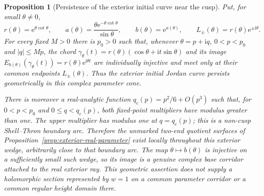\documentclass[11pt,a4paper]{article}
\newtheorem{proposition}[theorem]{Proposition}
\theoremstyle{definition}
\newcommand{\eee}{\mathrm{e}}
\newcommand{\ii}{\mathrm{i}}
\begin{document}
\begin{proposition}[Persistence of the exterior initial curve near the cusp]
\label{prop:exterior-curve-collar}
Put, for small $\theta\ne0$,
\[
 r(\theta)=\eee^{\theta\cot\theta},\qquad
 a(\theta)=\frac{\theta\eee^{-\theta\cot\theta}}{\sin\theta},
 \qquad b(\theta)=\eee^{a(\theta)},\qquad
 L_\pm(\theta)=r(\theta)\eee^{\pm\ii\theta}.
\]
For every fixed $M>0$ there is $p_0>0$ such that, whenever
$\theta=p+\ii q$, $0<p<p_0$ and $|q|\le Mp$, the chord
$\gamma_\theta(t)=r(\theta)(\cos\theta+\ii t\sin\theta)$ and its
image $E_{b(\theta)}(\gamma_\theta(t))=r(\theta)\eee^{\ii\theta t}$
are individually injective and meet only at their common endpoints
$L_\pm(\theta)$.  Thus the exterior initial Jordan curve persists
geometrically in this complex parameter cone.

There is moreover a real-analytic function
$q_c(p)=p^2/6+O(p^3)$ such that, for $0<p<p_0$ and
$0\le q<q_c(p)$, both fixed-point multipliers have modulus greater
than one.  The upper multiplier has modulus one at $q=q_c(p)$;
this is a non-cusp Shell--Thron boundary arc.  Therefore the
unmarked two-end quotient surfaces of
Proposition~\ref{prop:exterior-real-parameter} exist locally throughout
this exterior wedge, arbitrarily close to that boundary arc.  The map
$\theta\mapsto b(\theta)$ is injective on a sufficiently small such
wedge, so its image is a genuine complex base corridor attached to
the real exterior ray.  This
geometric assertion does not supply a holomorphic section represented
by $w=1$ on a common parameter corridor or a common regular height
domain there.
\end{proposition}
\end{document}
